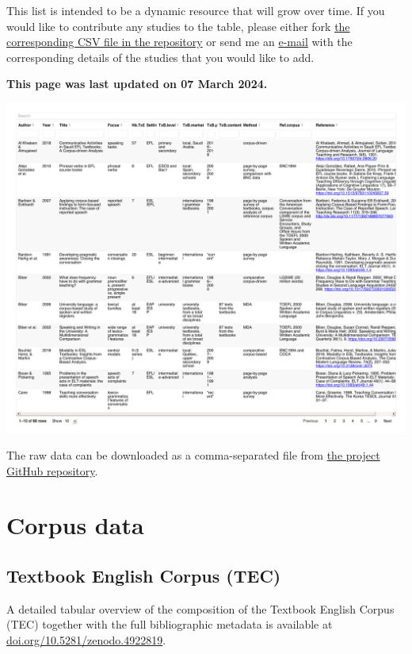 \documentclass[
  letterpaper,
  DIV=11,
  numbers=noendperiod]{scrreprt}
\begin{document}
This list is intended to be a dynamic resource that will grow over time.
If you would like to contribute any studies to the table, please either
fork
\href{https://github.com/elenlefoll/TextbookEnglish/blob/main/LitReviewTable.csv}{the
corresponding CSV file in the repository} or send me an
\href{mailto:elefoll@uni-koeln.de?subject=\%5BLitReviewTable\%5D\%20Suggestions}{e-mail}
with the corresponding details of the studies that you would like to
add.

\textbf{This page was last updated on 07 March 2024.}

\includegraphics{A_LitReviewTable_files/figure-pdf/display-1.pdf}

The raw data can be downloaded as a comma-separated file from
\href{https://github.com/elenlefoll/TextbookMDA}{the project GitHub
repository}.

\chapter{Corpus data}\label{corpus-data}

\section{Textbook English Corpus
(TEC)}\label{textbook-english-corpus-tec}

A detailed tabular overview of the composition of the Textbook English
Corpus (TEC) together with the full bibliographic metadata is available
at
\href{https://doi.org/10.5281/zenodo.4922819}{doi.org/10.5281/zenodo.4922819}.
\end{document}
